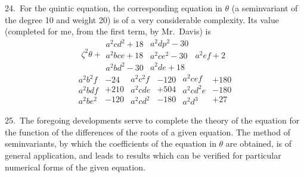 \documentclass[11pt,a4paper]{article}
\theoremstyle{plain}
\theoremstyle{definition}
\theoremstyle{remark}
\begin{document}
24.\ For the quintic equation, the corresponding equation in $\theta$ (a seminvariant of the degree 10 and weight 20) is of a very considerable complexity. Its value (completed for me, from the first term, by Mr.~Davis) is
\[
\zeta^2\theta +
\begin{array}{c}
a^2cd^2+18\\
a^2bce+18\\
a^2bd^2-30
\end{array}
\begin{array}{c}
a^2dp^2-30\\
a^2ce^2-30\\
a^2de+18
\end{array}
\begin{array}{c}
a^2ef+2
\end{array}
\]
\[
\begin{array}{c}
a^2b^2f\\
a^2bdf\\
a^2be^2
\end{array}
\begin{array}{r}
-24\\
+210\\
-120
\end{array}
\begin{array}{c}
a^2c^2f\\
a^2cde\\
a^2cd^2
\end{array}
\begin{array}{r}
-120\\
+504\\
-180
\end{array}
\begin{array}{c}
a^2cef\\
a^2cd^2e\\
a^2d^3
\end{array}
\begin{array}{r}
+180\\
-180\\
+27
\end{array}
\]

\newpage
\setcounter{page}{309}

25.\ The foregoing developments serve to complete the theory of the equation for the function of the differences of the roots of a given equation. The method of seminvariants, by which the coefficients of the equation in $\theta$ are obtained, is of general application, and leads to results which can be verified for particular numerical forms of the given equation.
\end{document}
